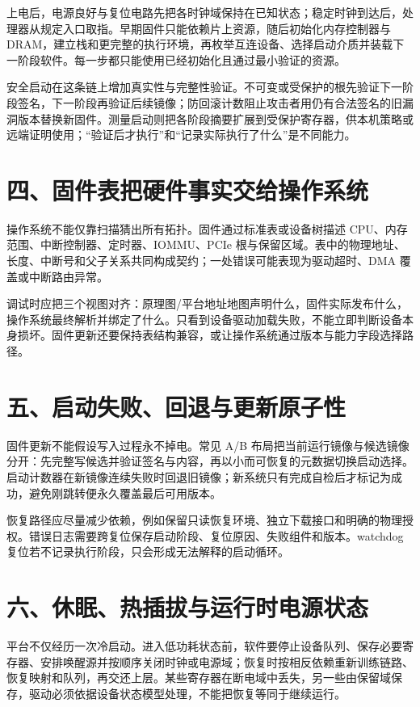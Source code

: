 上电后，电源良好与复位电路先把各时钟域保持在已知状态；稳定时钟到达后，处理器从规定入口取指。早期固件只能依赖片上资源，随后初始化内存控制器与 DRAM，建立栈和更完整的执行环境，再枚举互连设备、选择启动介质并装载下一阶段软件。每一步都只能使用已经初始化且通过最小验证的资源。

安全启动在这条链上增加真实性与完整性验证。不可变或受保护的根先验证下一阶段签名，下一阶段再验证后续镜像；防回滚计数阻止攻击者用仍有合法签名的旧漏洞版本替换新固件。测量启动则把各阶段摘要扩展到受保护寄存器，供本机策略或远端证明使用；“验证后才执行”和“记录实际执行了什么”是不同能力。

\section{四、固件表把硬件事实交给操作系统}

操作系统不能仅靠扫描猜出所有拓扑。固件通过标准表或设备树描述 CPU、内存范围、中断控制器、定时器、IOMMU、PCIe 根与保留区域。表中的物理地址、长度、中断号和父子关系共同构成契约；一处错误可能表现为驱动超时、DMA 覆盖或中断路由异常。

调试时应把三个视图对齐：原理图/平台地址地图声明什么，固件实际发布什么，操作系统最终解析并绑定了什么。只看到设备驱动加载失败，不能立即判断设备本身损坏。固件更新还要保持表结构兼容，或让操作系统通过版本与能力字段选择路径。

\section{五、启动失败、回退与更新原子性}

固件更新不能假设写入过程永不掉电。常见 A/B 布局把当前运行镜像与候选镜像分开：先完整写候选并验证签名与内容，再以小而可恢复的元数据切换启动选择。启动计数器在新镜像连续失败时回退旧镜像；新系统只有完成自检后才标记为成功，避免刚跳转便永久覆盖最后可用版本。

恢复路径应尽量减少依赖，例如保留只读恢复环境、独立下载接口和明确的物理授权。错误日志需要跨复位保存启动阶段、复位原因、失败组件和版本。watchdog 复位若不记录执行阶段，只会形成无法解释的启动循环。

\section{六、休眠、热插拔与运行时电源状态}

平台不仅经历一次冷启动。进入低功耗状态前，软件要停止设备队列、保存必要寄存器、安排唤醒源并按顺序关闭时钟或电源域；恢复时按相反依赖重新训练链路、恢复映射和队列，再交还上层。某些寄存器在断电域中丢失，另一些由保留域保存，驱动必须依据设备状态模型处理，不能把恢复等同于继续运行。

